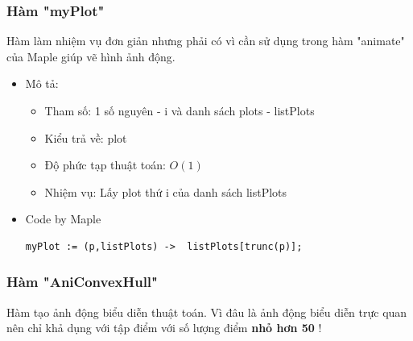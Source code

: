\documentclass[12pt]{article}
\begin{document}
      \subsubsection{Hàm "myPlot"}
        Hàm làm nhiệm vụ đơn giản nhưng phải có vì cần sử dụng trong hàm "animate" của Maple giúp vẽ hình ảnh động.
        \begin{itemize}
          \item Mô tả:
          \begin{itemize}
            \item Tham số: 1 số nguyên - i và danh sách plots - listPlots
            \item Kiểu trả về: plot 
            \item Độ phức tạp thuật toán: $O(1)$
            \item Nhiệm vụ: Lấy plot thứ i của danh sách listPlots
          \end{itemize}
          \item Code by Maple
            \begin{Verbatim}[frame=single]
  myPlot := (p,listPlots) ->  listPlots[trunc(p)];
            \end{Verbatim}
        \end{itemize}
      \subsubsection{Hàm "AniConvexHull"}
        Hàm tạo ảnh động biểu diễn thuật toán. Vì đâu là ảnh động biểu diễn trực quan nên chỉ khả dụng với tập điểm với số lượng điểm \textbf{nhỏ hơn 50} !
        
\end{document}
